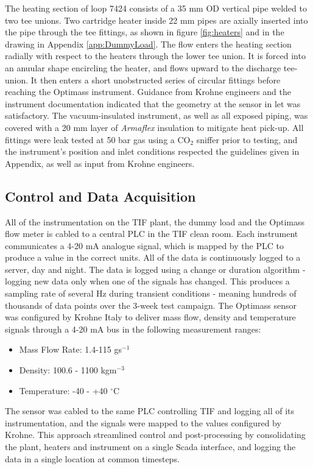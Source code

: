 \documentclass{report}
\begin{document}
The heating section of loop 7424 consists of a 35 mm OD vertical pipe welded to two tee unions. Two cartridge heater inside 22 mm pipes are axially inserted into the pipe through the tee fittings, as shown in figure \ref{fig:heaters} and in the drawing in Appendix \ref{app:DummyLoad}. The flow enters the heating section radially with respect to the heaters through the lower tee union. It is forced into an anuular shape encircling the heater, and flows upward to the discharge tee-union. It then enters a short unobstructed series of circular fittings before reaching the Optimass instrument. Guidance from Krohne engineers and the instrument documentation indicated that the geometry at the sensor in let was satisfactory.
The vacuum-insulated instrument, as well as all exposed piping, was covered with a 20 mm layer of \textit{Armaflex} insulation to mitigate heat pick-up. All fittings were leak tested at 50 bar gas using a CO$_2$ sniffer prior to testing, and the instrument's position and inlet conditions respected the guidelines given in Appendix, as well as input from Krohne engineers. 

\subsection{Control and Data Acquisition}
All of the instrumentation on the TIF plant, the dummy load and the Optimass flow meter is cabled to a central PLC in the TIF clean room. Each instrument communicates a 4-20 mA analogue signal, which is mapped by the PLC to produce a value in the correct units. All of the data is continuously logged to a server, day and night. The data is logged using a change or duration algorithm - logging new data only when one of the signals has changed. This produces a sampling rate of several Hz during transient conditions - meaning hundreds of thousands of data points over the 3-week test campaign.
The Optimass sensor was configured by Krohne Italy to deliver mass flow, density and temperature signals through a 4-20 mA bus in the following measurement ranges:\\
\begin{itemize}
\item{Mass Flow Rate: 1.4-115 gs$^{-1}$} 
\item{Density: 100.6 - 1100 kgm$^{-3}$}
\item{Temperature: -40 - +40 $^\circ$C}
\end{itemize}
The sensor was cabled to the same PLC controlling TIF and logging all of its instrumentation, and the signals were mapped to the values configured by Krohne. This approach streamlined control and post-processing by consolidating the plant, heaters and instrument on a single Scada interface, and logging the data in a single location at common timesteps. 
\end{document}
